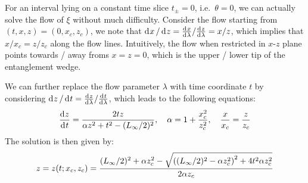 \documentclass[11pt,a4paper,utf8]{article}
\begin{document}
\pagebreak
	
	For an interval lying on a constant time slice $t_\pm = 0$, i.e.~$\theta = 0$, we can actually solve the flow of $\xi$ without much difficulty.
	Consider the flow starting from $(t,x,z) = (0,x_c,z_c)$, we note that $
		\mathinner{\mathrm{d}^{}x}/\mathinner{\mathrm{d}^{}z}
		= {\frac{\mathinner{\mathrm{d}^{}x}}{\mathinner{\mathrm{d}^{}\lambda}}}/{\frac{\mathinner{\mathrm{d}^{}z}}{\mathinner{\mathrm{d}^{}\lambda}}}
		= {x}/{z}
	$, which implies that ${x}/{x_c} = {z}/{z_c}$ along the flow lines. Intuitively, the flow when restricted in $x$-$z$ plane points towards / away froms $x = z = 0$, which is the upper / lower tip of the entanglement wedge. 
	
	We can further replace the flow parameter $\lambda$ with time coordinate $t$ by considering $
		\mathinner{\mathrm{d}^{}z}/\mathinner{\mathrm{d}^{}t}
		= {\frac{\mathinner{\mathrm{d}^{}z}}{\mathinner{\mathrm{d}^{}\lambda}}}/{\frac{\mathinner{\mathrm{d}^{}t}}{\mathinner{\mathrm{d}^{}\lambda}}}
	$, which leads to the following equations:
	\begin{equation}
		\frac{\mathinner{\mathrm{d}^{}z}}{\mathinner{\mathrm{d}^{}t}}
		= \frac{2tz}{\alpha z^2 + t^2 - (L_\infty/2)^2},
	\quad
		\alpha = 1 + \frac{x_c^2}{z_c^2},
	\quad
		\frac{x}{x_c} = \frac{z}{z_c}
	\end{equation}
	The solution is then given by:
	\begin{equation}
		z = z(t;x_c,z_c)
		= \frac{
				(L_\infty/2)^2 + \alpha z_c^2
				- \sqrt{
					\left((L_\infty/2)^2 - \alpha z_c^2\right)^2
					+ 4t^2 \alpha z_c^2
				}
			}{2\alpha z_c}
	\end{equation}
	
%	
	
\end{document}
